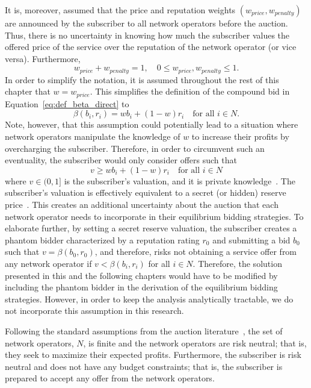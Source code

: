 It is, moreover, assumed that the price and reputation weights $(w_{price}, w_{penalty})$ are announced by the subscriber to all network operators before the auction. Thus, there is no uncertainty in knowing how much the subscriber values the offered price of the service over the reputation of the network operator (or vice versa). Furthermore,
\begin{equation*}
	w_{price} + w_{penalty} = 1,\quad 0\le w_{price},w_{penalty} \le 1.
\end{equation*}
In order to simplify the notation, it is assumed throughout the rest of this chapter that $w=w_{price}$. This simplifies the definition of the compound bid in Equation~\eqref{eq:def_beta_direct} to
\begin{equation*}
  \beta(b_i, r_i) = wb_i + (1-w)r_i\quad\text{for all } i\in N.
\end{equation*}
Note, however, that this assumption could potentially lead to a situation where network operators manipulate the knowledge of $w$ to increase their profits by overcharging the subscriber. Therefore, in order to circumvent such an eventuality, the subscriber would only consider offers such that
\begin{equation}
	\label{eq:subscribers_valuation_direct}
	v\geq wb_i + (1-w)r_i \quad\text{for all } i\in N
\end{equation}
where $v\in (0,1]$ is the subscriber's valuation, and it is private knowledge~\cite{DMLeBodic00}. The subscriber's valuation is effectively equivalent to a secret (or hidden) reserve price~\cite{Vincent1995575,LiPerrigne1999,BajariHortacsu2003}. This creates an additional uncertainty about the auction that each network operator needs to incorporate in their equilibrium bidding strategies. To elaborate further, by setting a secret reserve valuation, the subscriber creates a phantom bidder characterized by a reputation rating $r_0$ and submitting a bid $b_0$ such that $v=\beta(b_0,r_0)$, and therefore, risks not obtaining a service offer from any network operator if $v < \beta(b_i,r_i)$ for all $i\in N$. Therefore, the solution presented in this and the following chapters would have to be modified by including the phantom bidder in the derivation of the equilibrium bidding strategies. However, in order to keep the analysis analytically tractable, we do not incorporate this assumption in this research.
	
Following the standard assumptions from the auction literature~\cite{Krishna10}, the set of network operators, $N$, is finite and the network operators are risk neutral; that is, they seek to maximize their expected profits. Furthermore, the subscriber is risk neutral and does not have any budget constraints; that is, the subscriber is prepared to accept any offer from the network operators.

